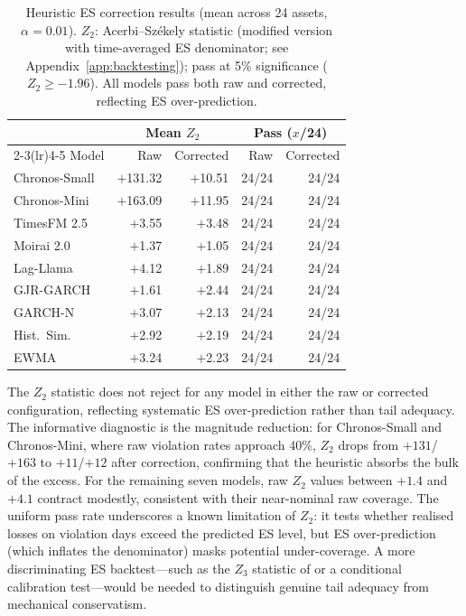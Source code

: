 \documentclass[preprint,11pt,authoryear]{elsarticle}
\newcommand{\1}{\boldsymbol{1}}
\begin{document}
	\begin{table}[H]
		\centering
		\caption{Heuristic ES correction results (mean across 24 assets, $\alpha = 0.01$). $Z_2$: Acerbi--Sz\'{e}kely statistic (modified version with time-averaged ES denominator; see Appendix~\ref{app:backtesting}); pass at 5\% significance ($Z_2 \geq -1.96$). All models pass both raw and corrected, reflecting ES over-prediction.}
		\label{tab:es_correction}
		\footnotesize
		\begin{tabular}{@{}l rr rr@{}}
			\toprule
			& \multicolumn{2}{c}{Mean $Z_2$} & \multicolumn{2}{c}{Pass ($x$/24)} \\
			\cmidrule(lr){2-3}\cmidrule(lr){4-5}
			Model & Raw & Corrected & Raw & Corrected \\
			\midrule
			Chronos-Small  & $+$131.32 & $+$10.51 & 24/24 & 24/24 \\
			Chronos-Mini   & $+$163.09 & $+$11.95 & 24/24 & 24/24 \\
			TimesFM 2.5    & $+$3.55 & $+$3.48 & 24/24 & 24/24 \\
			Moirai 2.0     & $+$1.37 & $+$1.05 & 24/24 & 24/24 \\
			Lag-Llama      & $+$4.12 & $+$1.89 & 24/24 & 24/24 \\
			\midrule
			GJR-GARCH      & $+$1.61 & $+$2.44 & 24/24 & 24/24 \\
			GARCH-N        & $+$3.07 & $+$2.13 & 24/24 & 24/24 \\
			Hist.\ Sim.    & $+$2.92 & $+$2.19 & 24/24 & 24/24 \\
			EWMA           & $+$3.24 & $+$2.23 & 24/24 & 24/24 \\
			\bottomrule
		\end{tabular}
	\end{table}

	The $Z_2$ statistic does not reject for any model in either the raw or corrected configuration, reflecting systematic ES over-prediction rather than tail adequacy. The informative diagnostic is the magnitude reduction: for Chronos-Small and Chronos-Mini, where raw violation rates approach 40\%, $Z_2$ drops from $+131$/$+163$ to $+11$/$+12$ after correction, confirming that the heuristic absorbs the bulk of the excess. For the remaining seven models, raw $Z_2$ values between $+1.4$ and $+4.1$ contract modestly, consistent with their near-nominal raw coverage. The uniform pass rate underscores a known limitation of $Z_2$: it tests whether realised losses on violation days exceed the predicted ES level, but ES over-prediction (which inflates the denominator) masks potential under-coverage. A more discriminating ES backtest---such as the $Z_3$ statistic of \citet{acerbi2014back} or a conditional calibration test---would be needed to distinguish genuine tail adequacy from mechanical conservatism.
\end{document}
